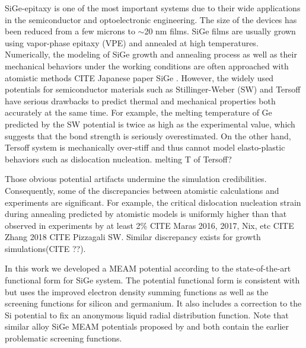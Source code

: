 \documentclass[review]{elsarticle}
\begin{document}
%
SiGe-epitaxy is one of the most important systems due to their wide applications in the semiconductor and optoelectronic engineering. The size of the devices has been reduced from a few microns to $\sim$20 nm films. SiGe films are usually grown using vapor-phase epitaxy (VPE)
and annealed at high temperatures. Numerically, the modeling of SiGe growth and annealing process as well as their mechanical behaviors under the working conditions are often approached with atomistic methods { \color{red} CITE Japanese paper SiGe }. However, the widely used potentials for semiconductor materials such as Stillinger-Weber (SW)\cite{XXX} and Tersoff\cite{XXX} have serious drawbacks to predict thermal and mechanical properties both accurately at the same time. 
For example, the melting temperature of Ge predicted by the SW potential is twice as high as the experimental value, which suggests that the bond strength is seriously overestimated. On the other hand, Tersoff system is mechanically over-stiff and thus cannot model elasto-plastic behaviors such as dislocation nucleation. {\color{red} melting T of Tersoff?} 

%
Those obvious potential artifacts undermine the simulation credibilities. Consequently, some of the discrepancies between atomistic calculations and experiments are significant. For example, the critical dislocation nucleation strain during annealing predicted by atomistic models is uniformly higher than that observed in experiments by at least 2\%  {\color{red} CITE Maras 2016, 2017, Nix, etc} {\color{red} {\color{red}CITE Zhang 2018}  CITE Pizzagali SW}. Similar discrepancy exists for growth simulations({\color{red}CITE ??}). 

%
In this work we developed a MEAM potential according to the state-of-the-art functional form \cite{grochola2010modified} for SiGe system.  The potential functional form is consistent with \cite{baskes1992modified} but uses the improved electron density summing functions as well as the screening functions for silicon and germanium. It also includes a correction to the Si potential to fix an anonymous liquid radial distribution function. 
Note that similar alloy SiGe MEAM potentials proposed by \cite{swadener2009strain} and\cite{read2007multiscale} both contain the earlier problematic screening functions. 
\end{document}
